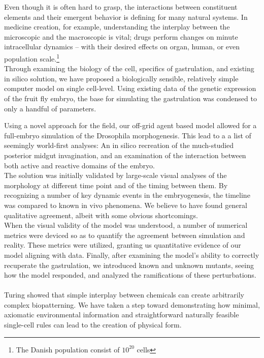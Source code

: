 Even though it is often hard to grasp, the interactions between constituent elements and their emergent behavior is defining for many natural systems. In medicine creation, for example, understanding the interplay between the microscopic and the macroscopic is vital; drugs perform changes on minute intracellular dynamics -- with their desired effects on organ, human, or even population scale.\footnote{The Danish population consist of $10^{20}$ cells}\\ 

Through examining the biology of the cell, specifics of gastrulation, and existing in silico solution, we have proposed a biologically sensible, relatively simple computer model on single cell-level. Using existing data of the genetic expression of the fruit fly embryo, the base for simulating the gastrulation was condensed to only a handful of parameters. 

Using a novel approach for the field, our off-grid agent based model allowed for a full-embryo simulation of the Drosophila morphogenesis. This lead to a a list of seemingly world-first analyses: An in silico recreation of the much-studied posterior midgut invagination, and an examination of the interaction between both active and reactive domains of the embryo. \\

The solution was initially validated by large-scale visual analyses of the morphology at different time point and of the timing between them. By recognizing a number of key dynamic events in the embryogenesis, the timeline was compared to known in vivo phenomena. We believe to have found general qualitative agreement, albeit with some obvious shortcomings.\\

When the visual validity of the model was understood, a number of numerical metrics were deviced so as to quantify the agreement between simulation and reality. These metrics were utilized, granting us quantitative evidence of our model aligning with data. Finally, after examining the model's ability to correctly recuperate the gastrulation, we introduced known and unknown mutants, seeing how the model responded, and analyzed the ramifications of these perturbations. \\\\

Turing showed that simple interplay between chemicals can create arbitrarily complex biopatterning. We have taken a step toward demonstrating how minimal, axiomatic environmental information and straightforward naturally feasible single-cell rules can lead to the creation of physical form.\\


